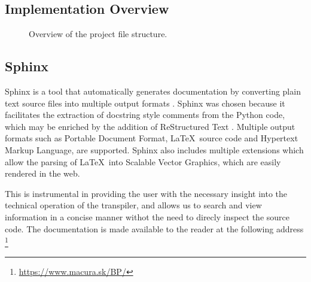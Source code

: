 \subsection{Implementation Overview}


\begin{figure}[H]
 
  \label{fig:project-structure}
  \centering
{}

\caption{Overview of the project file structure.}
\end{figure}

\subsection{Sphinx}
Sphinx is a tool that automatically generates documentation by converting plain text source files into multiple output formats \cite{sphinx_quickstart}. Sphinx was chosen because it facilitates the extraction of docstring style comments from the Python code, which may be enriched by the addition of ReStructured Text \cite{docutils_rst}. Multiple output formats such as Portable Document Format, \LaTeX \ source code and Hypertext Markup Language, are supported. Sphinx also includes multiple extensions which allow the parsing of \LaTeX \ into Scalable Vector Graphics, which are easily rendered in the web.

This is instrumental in providing the user with the necessary insight into the technical operation of the transpiler, and allows us to search and view information in a concise manner withot the need to direcly inspect the source code. The documentation is made available to the reader at the following address \footnote{\url{https://www.macura.sk/BP/}}

